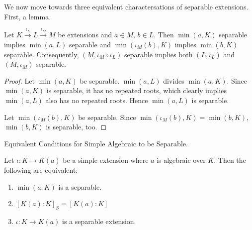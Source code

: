 \documentclass[../book.tex]{subfiles}
\begin{document}
We now move towards three equivalent charactersations of separable extensions. 
First, a lemma. 
\begin{lem} 
    
    Let $K \overset{\iota_L}{\to} L \overset{\iota_M}{\to} M$ be extensions
    and $a \in M$, $b \in L$. 
    Then $\min(a,K)$ separable implies $\min(a,L)$ separable
    and $\min(\iota_M(b),K)$ implies $\min(b,K)$ separable.
    Consequently, $(M,\iota_M\circ\iota_L)$ separable implies
    both $(L,\iota_L)$ and $(M,\iota_M)$ separable. 
\end{lem}
\begin{proof}
    Let $\min(a,K)$ be separable.
    $\min(a,L)$ divides $\min(a,K)$. 
    Since $\min(a,K)$ is separable, it has no repeated roots,
    which clearly implies $\min(a,L)$ also has no repeated roots. 
    Hence $\min(a,L)$ is separable. 
    
    Let $\min(\iota_M(b),K)$ be separable. 
    Since $\min(\iota_M(b),K) = \min(b,K)$, $\min(b,K)$ is separable, too. 
\end{proof}
\begin{thm} Equivalent Conditions for Simple Algebraic to be Separable.

    Let $\iota : K \to K(a)$ be a simple extension where $a$ is algebraic over $K$.
    Then the following are equivalent: 
    \begin{enumerate}
        \item $\min(a,K)$ is a separable.
        \item $[K(a) : K]_S = [K(a) : K]$
        \item $\iota : K \to K(a)$ is a separable extension. 
    \end{enumerate}
\end{thm}
\end{document}
